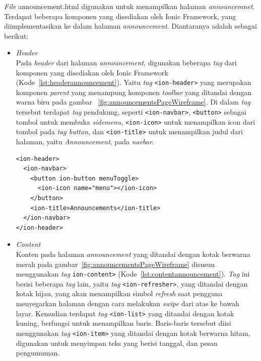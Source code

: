 \begin{enumerate}
\begin{enumerate}
	\textit{File} announcement.html digunakan untuk menampilkan halaman \textit{announcemnet}. Terdapat beberapa komponen yang disediakan oleh Ionic Framework, yang diimplementasikan ke dalam halaman \textit{announcement}. Diantaranya adalah sebagai berikut:	
	
	\begin{itemize}
		\item \textit{Header} \\
		Pada \textit{header} dari halaman \textit{announcement}, digunakan beberapa \textit{tag} dari komponen yang disediakan oleh Ionic Framework (Kode~\ref{lst:headerannouncement}). Yaitu \textit{tag} \texttt{<ion-header>} yang merupakan komponen \textit{parent} yang menampung komponen \textit{toolbar} yang ditandai dengan warna biru pada gambar ~\ref{fig:announcementsPageWireframe}. Di dalam \textit{tag} tersebut terdapat \textit{tag} pendukung, seperti \texttt{<ion-navbar>}, \texttt{<button>} sebagai tombol untuk membuka \textit{sidemenu}, \texttt{<ion-icon>} untuk menampilkan icon dari tombol pada \textit{tag button}, dan \texttt{<ion-title>} untuk menampilkan judul dari halaman, yaitu \textit{Announcement}, pada \textit{navbar}.\newpage
\begin{lstlisting}[label={lst:headerannouncement}, caption=\textit{Header} pada Halaman \textit{Annoncement}]
<ion-header>
  <ion-navbar>
    <button ion-button menuToggle>
      <ion-icon name="menu"></ion-icon>
    </button>
    <ion-title>Announcements</ion-title>
  </ion-navbar>
</ion-header>
\end{lstlisting} 

		\item \textit{Content} \\
		Konten pada halaman \textit{announcement} yang ditandai dengan kotak berwarna merah pada gambar~\ref{fig:announcementsPageWireframe} disusun menggunakan \textit{tag} \texttt{ion-content>} (Kode~\ref{lst:contentannouncement}). \textit{Tag} ini berisi beberapa \textit{tag} lain, yaitu \textit{tag} \texttt{<ion-refresher>}, yang ditandai dengan kotak hijau, yang akan menampilkan simbol \textit{refresh} saat pengguna menyegarkan halaman dengan cara melakukan \textit{swipe} dari atas ke bawah layar. Kemudian terdapat \textit{tag} \texttt{<ion-list>} yang ditandai dengan kotak kuning, berfungsi untuk menampilkan baris. Baris-baris tersebut diisi menggunakan \textit{tag} \texttt{<ion-item>} yang ditandai dengan kotak berwarna hitam, digunakan untuk menyimpan teks yang berisi tanggal, dan pesan pengumuman.


\end{itemize}
\end{enumerate}
\end{enumerate}
